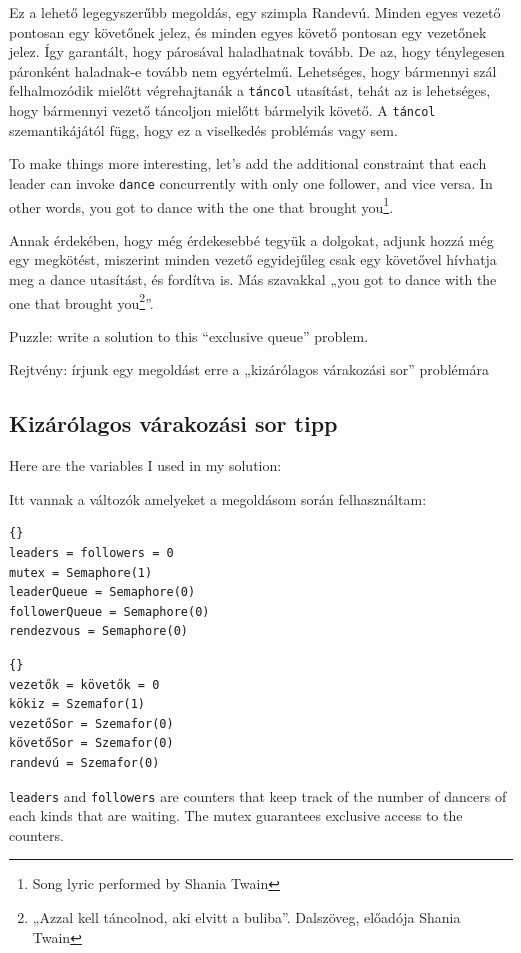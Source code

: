 \documentclass{book}
\newcommand{\clearemptydoublepage}{\newpage\cleardoublepage}
\begin{document}
Ez a lehető legegyszerűbb megoldás, egy szimpla Randevú. Minden egyes
vezető pontosan egy követőnek jelez, és minden egyes követő pontosan
egy vezetőnek jelez. Így garantált, hogy párosával haladhatnak tovább.
De az, hogy ténylegesen páronként haladnak-e tovább nem egyértelmű.
Lehetséges, hogy bármennyi szál felhalmozódik mielőtt végrehajtanák
a {\tt táncol} utasítást, tehát az is lehetséges, hogy bármennyi vezető
táncoljon mielőtt bármelyik követő. A {\tt táncol} szemantikájától függ,
hogy ez a viselkedés problémás vagy sem.

To make things more interesting, let's add the additional constraint
that each leader can invoke {\tt dance} concurrently with only
one follower, and vice versa.  In other words, you got to dance
with the one that brought you\footnote{Song lyric performed by Shania
Twain}.

Annak érdekében, hogy még érdekesebbé tegyük a dolgokat, adjunk hozzá
még egy megkötést, miszerint minden vezető egyidejűleg csak egy követővel
hívhatja meg a dance utasítást, és fordítva is. Más szavakkal „you got to
dance with the one that brought you\footnote{„Azzal kell táncolnod, aki elvitt a buliba”.
Dalszöveg, előadója Shania Twain}”.

Puzzle: write a solution to this ``exclusive queue'' problem.

Rejtvény: írjunk egy megoldást erre a „kizárólagos várakozási sor” problémára

\clearemptydoublepage
\subsection {Kizárólagos várakozási sor tipp}

Here are the variables I used in my solution:

Itt vannak a változók amelyeket a megoldásom során felhasználtam:

\begin{lstlisting}[title={Queue hint}]{}
leaders = followers = 0
mutex = Semaphore(1)
leaderQueue = Semaphore(0)
followerQueue = Semaphore(0)
rendezvous = Semaphore(0)
\end{lstlisting}

\begin{lstlisting}[title={Kizárólagos várakozási sor tipp}]{}
vezetők = követők = 0
kökiz = Szemafor(1)
vezetőSor = Szemafor(0)
követőSor = Szemafor(0)
randevú = Szemafor(0)
\end{lstlisting}

{\tt leaders} and {\tt followers} are counters that
keep track of the number of dancers of each kinds that are
waiting.  The mutex guarantees exclusive access to the counters.
\end{document}
